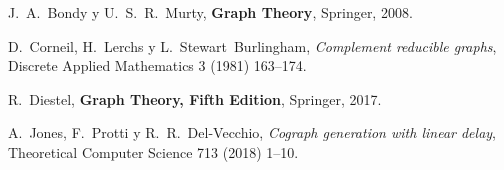 \begin{thebibliography}{99}

  J.~A.~Bondy y U.~S.~R.~Murty,
  \textbf{Graph Theory},
  Springer, 2008.

  D.~Corneil, H.~Lerchs y L.~Stewart~Burlingham,
  \textit{Complement reducible graphs},
  Discrete Applied Mathematics 3 (1981) 163--174.

  R.~Diestel,
  \textbf{Graph Theory, Fifth Edition},
  Springer, 2017.

  A.~Jones, F.~Protti y R.~R.~Del-Vecchio,
  \textit{Cograph generation with linear delay},
  Theoretical Computer Science 713 (2018) 1--10.

\end{thebibliography}
